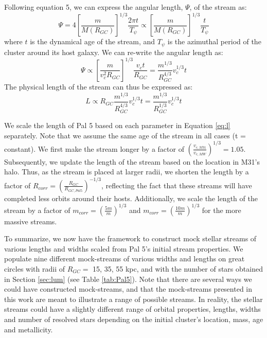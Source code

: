\documentclass[twocolumn]{aastex62}
\begin{document}
Following \citet{johnston01} equation 5, we can express the angular length, $\Psi$, of the stream as:
\begin{equation}
\Psi = 4  \left[\frac{m}{M(R_{GC})}\right]^{1/3}  \frac{2 \pi t}{T_{\psi}} \propto \left[\frac{m}{M(R_{GC})}\right]^{1/3}  \frac{t}{T_{\psi}}
\end{equation}
where $t$ is the dynamical age of the stream, and $T_{\psi}$ is the azimuthal period of the cluster around its host galaxy. We can re-write the angular length as:
\begin{equation}
\Psi \propto \left[\frac{m }{v_c^2 R_{GC}}\right]^{1/3}  \frac{v_c t }{R_{GC}} = \frac{m^{1/3}}{R_{GC}^{4/3}} v_c^{1/3}t
\end{equation}
The physical length of the stream can thus be expressed as:
\begin{equation}
\label{eq:l}
L \propto R_{GC} \frac{m^{1/3}}{R_{GC}^{4/3}} v_c^{1/3}t = \frac{m^{1/3}}{R_{GC}^{1/3}} v_c^{1/3}t
\end{equation}

We scale the length of Pal 5 based on each parameter in Equation \ref{eq:l} separately. Note that we assume the same age of the stream in all cases (t = constant). We first make the stream longer by a factor of $(\frac{v_{c,M31}}{v_{c,MW}})^{1/3} = 1.05$. Subsequently, we update the length of the stream based on the location in M31's halo. Thus, as the stream is placed at larger radii, we shorten the length by a factor of  $R_{corr} = \left(\frac{R_{GC}}{R_{GC,Pal5}}\right)^{-1/3}$, reflecting the fact that these streams will have completed less orbits around their hosts.
Additionally, we scale the length of the stream by a factor of $m_{corr} = \left(\frac{5m}{m}\right)^{1/3}$ and $m_{corr} = \left(\frac{10m}{m}\right)^{1/3}$ for the more massive streams. 

To summarize, we now have the framework to construct mock stellar streams of various lengths and widths scaled from Pal 5's initial stream properties. We populate nine different mock-streams of various widths and lengths on great circles with radii of $R_{GC} =$ 15, 35, 55 kpc, and with the number of stars obtained in Section \ref{sec:lum} (see Table \ref{tab:Pal5}). Note that there are several ways we could have constructed mock-streams, and that the mock-streams presented in this work are meant to illustrate a range of possible streams. In reality, the stellar streams could have a slightly different range of orbital properties, lengths, widths and number of resolved stars depending on the initial cluster's location, mass, age and metallicity.
\end{document}
